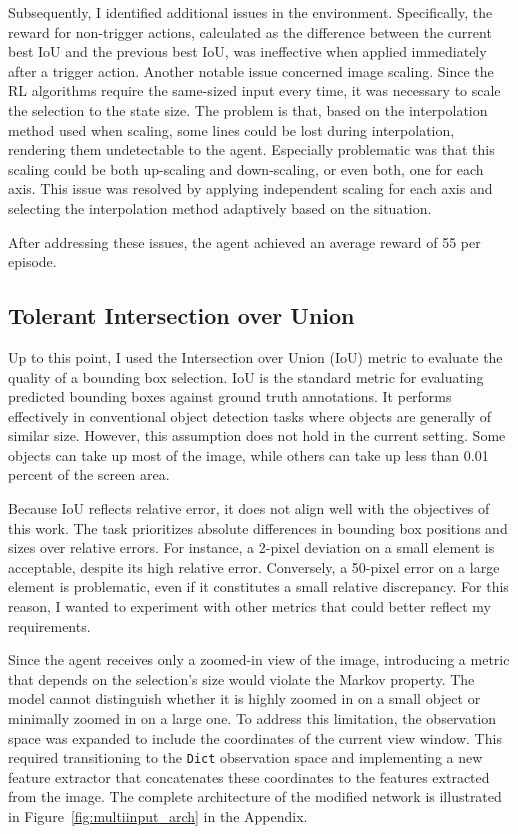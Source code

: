 \documentclass[
  digital,     %
  oneside,     %
  nosansbold,  %
  nocolorbold, %
  lof,         %
  lot,         %
]{fithesis4}
\begin{document}
Subsequently, I identified additional issues in the environment. Specifically, the reward for non-trigger actions, calculated as the difference between the current best IoU and the previous best IoU, was ineffective when applied immediately after a trigger action.
Another notable issue concerned image scaling. Since the RL algorithms require the same-sized input every time, it was necessary to scale the selection to the state size. The problem is that, based on the interpolation method used when scaling, some lines could be lost during interpolation, rendering them undetectable to the agent. Especially problematic was that this scaling could be both up-scaling and down-scaling, or even both, one for each axis. This issue was resolved by applying independent scaling for each axis and selecting the interpolation method adaptively based on the situation.

After addressing these issues, the agent achieved an average reward of 55 per episode.

\subsection{Tolerant Intersection over Union}
\label{subsec:eval_metric}

Up to this point, I used the Intersection over Union (IoU) metric to evaluate the quality of a bounding box selection. IoU is the standard metric for evaluating predicted bounding boxes against ground truth annotations. It performs effectively in conventional object detection tasks where objects are generally of similar size. However, this assumption does not hold in the current setting. Some objects can take up most of the image, while others can take up less than 0.01 percent of the screen area.

Because IoU reflects relative error, it does not align well with the objectives of this work. The task prioritizes absolute differences in bounding box positions and sizes over relative errors. For instance, a 2-pixel deviation on a small element is acceptable, despite its high relative error. Conversely, a 50-pixel error on a large element is problematic, even if it constitutes a small relative discrepancy. For this reason, I wanted to experiment with other metrics that could better reflect my requirements.

Since the agent receives only a zoomed-in view of the image, introducing a metric that depends on the selection’s size would violate the Markov property. The model cannot distinguish whether it is highly zoomed in on a small object or minimally zoomed in on a large one. To address this limitation, the observation space was expanded to include the coordinates of the current view window. This required transitioning to the \texttt{Dict} observation space and implementing a new feature extractor that concatenates these coordinates to the features extracted from the image. The complete architecture of the modified network is illustrated in Figure~\ref{fig:multiinput_arch} in the Appendix.
\end{document}
